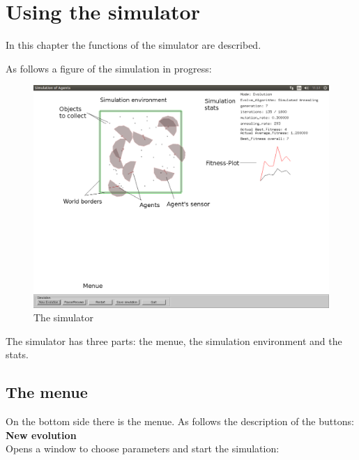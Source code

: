 \documentclass[10pt,a4paper,DIV=11]{scrreprt}
\begin{document}
\chapter{Using the simulator}
\begin{LARGE}
In this chapter the functions of the simulator are described.

As follows a figure of the simulation in progress: \\

\begin{center}
	\begin{figure}[H]
		\centering
		\includegraphics[width=1.0\textwidth,scale=1]{simuinaction.png}  
		\caption{The simulator}
		\label{fig:simulator}
	\end{figure}
\end{center}

The simulator has three parts: the menue, the simulation environment and the stats.
\section{The menue}
On the bottom side there is the menue. As follows the description of the buttons: \\
\textbf{New evolution} \\ Opens a window to choose parameters and start the simulation: \\


\end{LARGE}
\end{document}
